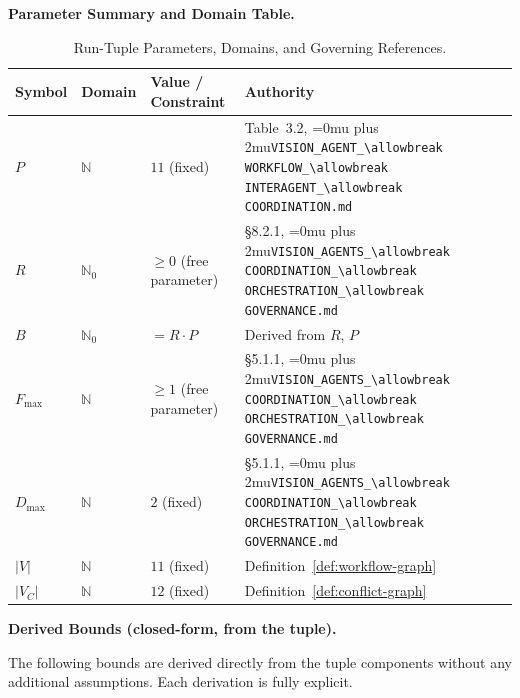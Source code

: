 \documentclass[12pt]{article}
\theoremstyle{definition}
\DeclareRobustCommand{\code}[1]{\begingroup\Urlmuskip=0mu plus 2mu\relax\nolinkurl{#1}\endgroup}
\newcommand{\VisionGov}{\code{VISION\_AGENTS\_\allowbreak COORDINATION\_\allowbreak ORCHESTRATION\_\allowbreak GOVERNANCE.md}}
\newcommand{\VisionFlow}{\code{VISION\_AGENT\_\allowbreak WORKFLOW\_\allowbreak INTERAGENT\_\allowbreak COORDINATION.md}}
\begin{document}
\medskip
\noindent\textbf{Parameter Summary and Domain Table.}

\begin{table}[H]
\centering
\caption{Run-Tuple Parameters, Domains, and Governing References.}
\label{tab:params}
\begin{tabular}{@{}l l l p{4.0cm}@{}}
\toprule
\textbf{Symbol} & \textbf{Domain} & \textbf{Value / Constraint}
  & \textbf{Authority} \\
\midrule
$P$
  & $\mathbb{N}$
  & $11$ (fixed)
  & Table~3.2, \VisionFlow{} \\
$R$
  & $\mathbb{N}_0$
  & $\geq 0$ (free parameter)
  & \S8.2.1, \VisionGov{} \\
$B$
  & $\mathbb{N}_0$
  & $= R \cdot P$
  & Derived from $R$, $P$ \\
$F_{\max}$
  & $\mathbb{N}$
  & $\geq 1$ (free parameter)
  & \S5.1.1, \VisionGov{} \\
$D_{\max}$
  & $\mathbb{N}$
  & $2$ (fixed)
  & \S5.1.1, \VisionGov{} \\
$|V|$
  & $\mathbb{N}$
  & $11$ (fixed)
  & Definition~\ref{def:workflow-graph} \\
$|V_C|$
  & $\mathbb{N}$
  & $12$ (fixed)
  & Definition~\ref{def:conflict-graph} \\
\bottomrule
\end{tabular}
\end{table}

\medskip
\noindent\textbf{Derived Bounds (closed-form, from the tuple).}

The following bounds are derived directly from the tuple components
without any additional assumptions.  Each derivation is fully
explicit.
\end{document}
